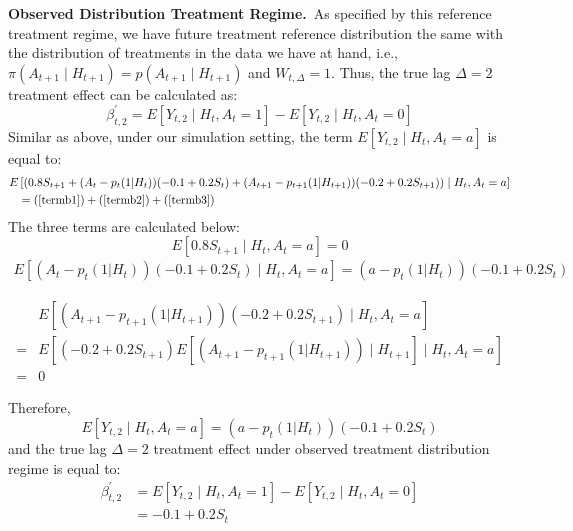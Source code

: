 \documentclass[supplementary, lineno]{biometrika}
\begin{document}
\noindent \textbf{Observed Distribution Treatment Regime.}~As specified by this reference treatment regime, we have future treatment reference distribution the same with the distribution of treatments in the data we have at hand, i.e., $\pi(A_{t+1}\mid H_{t+1}) = p(A_{t+1}\mid H_{t+1})$ and $W_{t,\Delta} =1$. Thus, the true lag $\Delta=2$ treatment effect can be calculated as:
\begin{equation}
    \beta^\prime_{t,2} = E \left[ Y_{t,2} \mid H_{t}, A_{t} = 1 \right] - E \left[ Y_{t,2} \mid H_{t}, A_{t} = 0 \right]
\end{equation}
Similar as above, under our simulation setting, the term $E \left[ Y_{t,2} \mid H_{t}, A_{t} = a \right]$ is equal to:
\begin{align*}
    E &\left[ \left( 0.8 S_{t+1} + (A_t - p_t(1| H_t)) (-0.1 + 0.2 S_{t}) + (A_{t+1} - p_{t+1}(1 | H_{t+1})) (-0.2 + 0.2 S_{t+1} ) \right)   \mid H_{t}, A_{t} = a \right] \\
    &= \text{(\ref{termb1})} + \text{(\ref{termb2})} + \text{(\ref{termb3})} 
\end{align*}
The three terms are calculated below:
\begin{equation}
\label{termb1}
    E \left[ 0.8 S_{t+1}   \mid H_{t}, A_{t} = a \right] = 0
\end{equation}
\begin{align}
\label{termb2}
         E \left[(A_t - p_t(1| H_t)) (-0.1 + 0.2 S_{t})  \mid H_{t}, A_{t} = a \right] = (a - p_t(1| H_t)) (-0.1 + 0.2 S_{t}) 
\end{align}

\begin{align}
\label{termb3}
    & E \left[ (A_{t+1} - p_{t+1}(1 | H_{t+1})) (-0.2 + 0.2 S_{t+1} )   \mid H_{t}, A_{t} = a \right] \nonumber \\
     = &E \left[ (-0.2 + 0.2 S_{t+1} ) E \left[ (A_{t+1} - p_{t+1}(1 | H_{t+1}))   \mid H_{t+1} \right] \mid H_{t}, A_{t} = a \right] \nonumber \\
     = &0
\end{align}

Therefore, 
\begin{equation*}
    E \left[ Y_{t,2}   \mid H_{t}, A_{t} = a \right] =  (a - p_t(1| H_t)) (-0.1 + 0.2 S_{t})
\end{equation*}
and the true lag $\Delta=2$ treatment effect under observed treatment distribution regime is equal to:
\begin{align}
    \beta^\prime_{t,2}&= E \left[ Y_{t,2}   \mid H_{t}, A_{t} = 1 \right]  -  E \left[ Y_{t,2}   \mid H_{t}, A_{t} = 0 \right] \nonumber \\
    & =-0.1 + 0.2S_t 
\end{align}
\end{document}
